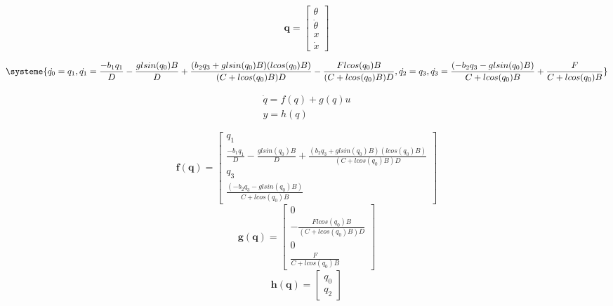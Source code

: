 \documentclass[a4paper]{article}
\begin{document}
\begin{equation}
\mathbf{q} =
\left[ \begin{array}{ccc}
\theta \\
\dot{\theta}\\
x \\
\dot{x}
\end{array} \right]
\end{equation}

\[
\systeme{
\dot{q_0} = q_1,
\dot{q_1} = \frac{-b_1 q_1}{D} - \frac{glsin(q_0)B}{D} + \frac{(b_2 q_3  + glsin(q_0)B) (lcos(q_0)B)}{(C + lcos(q_0)B)D} - \frac{F lcos(q_0)B}{(C + lcos(q_0)B)D},
\dot{q_2} = q_3,
\dot{q_3} =  \frac{(-b_2 q_3  - glsin(q_0)B)}{C + lcos(q_0)B} + \frac{F}{C + lcos(q_0)B}
}
\]

\begin{gather}
\dot{q} = f(q) + g(q)u \\
y = h(q)
\end{gather}

\begin{equation}
\mathbf{f(q)} =
\left[ \begin{array}{ccc}
q_1 \\
\frac{-b_1 q_1}{D} - \frac{glsin(q_0)B}{D} + \frac{(b_2 q_3  + glsin(q_0)B) (lcos(q_0)B)}{(C + lcos(q_0)B)D}  \\
q_3 \\
\frac{(-b_2 q_3  - glsin(q_0)B)}{C + lcos(q_0)B}
\end{array} \right]
\end{equation}
\begin{equation}
\mathbf{g(q)} =
\left[ \begin{array}{ccc}
0 \\
- \frac{F lcos(q_0)B}{(C + lcos(q_0)B)D} \\
0 \\
\frac{F}{C + lcos(q_0)B}
\end{array} \right]
\end{equation}
\begin{equation}
\mathbf{h(q)} =
\left[ \begin{array}{c}
q_0 \\
q_2 
\end{array} \right]
\end{equation}
\end{document}
